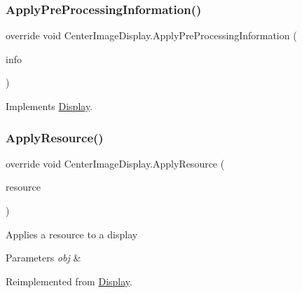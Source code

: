 \subsubsection{\texorpdfstring{Apply\+Pre\+Processing\+Information()}{ApplyPreProcessingInformation()}}
{\footnotesize\ttfamily override void Center\+Image\+Display.\+Apply\+Pre\+Processing\+Information (\begin{DoxyParamCaption}\item[{\mbox{\hyperlink{class_pre_processing_game_object_information}{Pre\+Processing\+Game\+Object\+Information}}}]{info }\end{DoxyParamCaption})\hspace{0.3cm}{\ttfamily [virtual]}}



Implements \mbox{\hyperlink{class_display_ab9cd24c11c43dd87bc50e85a8e9e4c31}{Display}}.

\mbox{\label{class_center_image_display_a140b8b82522c1aedb473b3cd532dcd34}} 
\subsubsection{\texorpdfstring{Apply\+Resource()}{ApplyResource()}}
{\footnotesize\ttfamily override void Center\+Image\+Display.\+Apply\+Resource (\begin{DoxyParamCaption}\item[{\mbox{\hyperlink{class_base_display_resource}{Base\+Display\+Resource}}}]{resource }\end{DoxyParamCaption})\hspace{0.3cm}{\ttfamily [virtual]}}



Applies a resource to a display 


\begin{DoxyParams}{Parameters}
{\em obj} & \\
\hline
\end{DoxyParams}


Reimplemented from \mbox{\hyperlink{class_display_a811157ddb42ae4d72f690457a08711d3}{Display}}.

\mbox{\label{class_center_image_display_a413c4767daa6cca041577ba63eb3b8d5}} 
